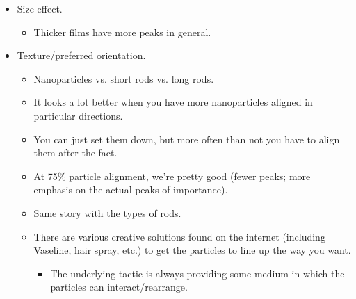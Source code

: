 \documentclass[../notes.tex]{subfiles}
\begin{document}
\begin{itemize}
\begin{itemize}
    \end{itemize}
    \item Size-effect.
    \begin{itemize}
        \item Thicker films have more peaks in general.
    \end{itemize}
    \item Texture/preferred orientation.
    \begin{itemize}
        \item Nanoparticles vs. short rods vs. long rods.
        \item It looks a lot better when you have more nanoparticles aligned in particular directions.
        \item You can just set them down, but more often than not you have to align them after the fact.
        \item At 75\% particle alignment, we're pretty good (fewer peaks; more emphasis on the actual peaks of importance).
        \item Same story with the types of rods.
        \item There are various creative solutions found on the internet (including Vaseline, hair spray, etc.) to get the particles to line up the way you want.
        \begin{itemize}
            \item The underlying tactic is always providing some medium in which the particles can interact/rearrange.
        \end{itemize}
    \end{itemize}
\end{itemize}
\end{document}
